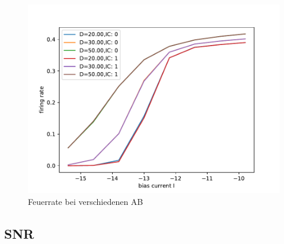 \documentclass[12pt,a4paper]{article}
\begin{document}
\begin{figure}[H]
\centering
\includegraphics[scale=1]{gneursinglerealrinzel15ninv0realrinzel15ninv1.pdf}\caption{Feuerrate bei verschiedenen AB}
\label{grinzelab}
\end{figure}
\subsection{SNR}
\end{document}

